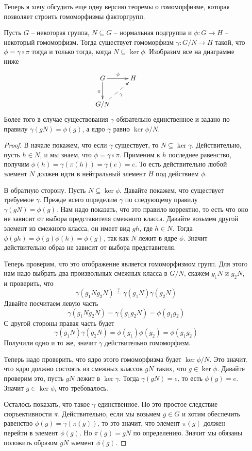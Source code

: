 Теперь я хочу обсудить еще одну версию теоремы о гомоморфизме, которая позволяет строить гомоморфизмы факторгрупп.

\begin{claim}
\label{claim::HomoThmGroups2}
Пусть $G$ -- некоторая группа, $N\subseteq G$ -- нормальная подгруппа и $\phi\colon G\to H$ -- некоторый гомоморфизм.
Тогда существует гомоморфизм $\gamma \colon G/N \to H$ такой, что $\phi = \gamma \circ \pi$ тогда и только тогда, когда $N\subseteq \ker \phi$.
Изобразим все на диаграмме ниже
\[
\xymatrix{
	{G}\ar[r]^{\phi}\ar[d]_{\pi}&{H}&\\
	{G/N}\ar@{-->}[ru]_{\gamma}&{}
}
\]
Более того в случае существования $\gamma$ обязательно единственное и задано по правилу $\gamma(gN) = \phi(g)$, а ядро $\gamma$ равно $\ker \phi / N$.
\end{claim}
\begin{proof}
В начале покажем, что если $\gamma$ существует, то $N\subseteq \ker \gamma$.
Действительно, пусть $h\in N$, и мы знаем, что $\phi = \gamma \circ \pi$.
Применим к $h$ последнее равенство, получим $\phi(h) = \gamma(\pi(h)) = \gamma(e) = e$.
То есть действительно любой элемент $N$ должен идти в нейтральный элемент $H$ под действием $\phi$.

В обратную сторону.
Пусть $N\subseteq \ker \phi$.
Давайте покажем, что существует требуемое $\gamma$.
Прежде всего определим $\gamma$ по следующему правилу $\gamma(gN) = \phi(g)$.
Нам надо показать, что это правило корректно, то есть что оно не зависит от выбора представителя смежного класса.
Давайте возьмем другой элемент из смежного класса, он имеет вид $gh$, где $h\in N$.
Тогда $\phi(gh) = \phi(g) \phi(h) = \phi(g)$, так как $N$ лежит в ядре $\phi$.
Значит действительно образ не зависит от выбора представителя.

Теперь проверим, что это отображение является гомоморфизмом групп.
Для этого нам надо выбрать два произвольных смежных класса в $G/N$, скажем $g_1 N$ и $g_2N$, и проверить, что
\[
\gamma(g_1  N g_2  N) \stackrel{?}{=} \gamma(g_1  N) \gamma (g_2  N)
\]
Давайте посчитаем левую часть
\[
\gamma(g_1  N g_2  N) = \gamma(g_1 g_2 N) = \phi(g_1g_2)
\]
С другой стороны правая часть будет
\[
\gamma(g_1N) \gamma(g_2 N) = \phi(g_1) \phi(g_2) = \phi(g_1 g_2)
\]
Получили одно и то же, значит $\gamma$ действительно гомоморфизм.

Теперь надо проверить, что ядро этого гомоморфизма будет $\ker \phi / N$.
Это значит, что ядро должно состоять из смежных классов $gN$ таких, что $g\in \ker \phi$.
Давайте проверим это, пусть $gN$ лежит в $\ker \gamma$.
Тогда $\gamma(gN) = e$, то есть $\phi(g) = e$.
Значит $g\in \ker \phi$, что требовалось.

Осталось показать, что такое $\gamma$ единственное.
Но это простое следствие сюръективности $\pi$.
Действительно, если мы возьмем $g\in G$ и хотим обеспечить равенство $\phi(g) = \gamma(\pi(g))$, то это значит, что элемент $\pi(g)$ должен перейти в элемент $\phi(g)$.
Но $\pi(g)= gN$ по определению.
Значит мы обязаны положить образом $gN$ элемент $\phi(g)$.
\end{proof}

